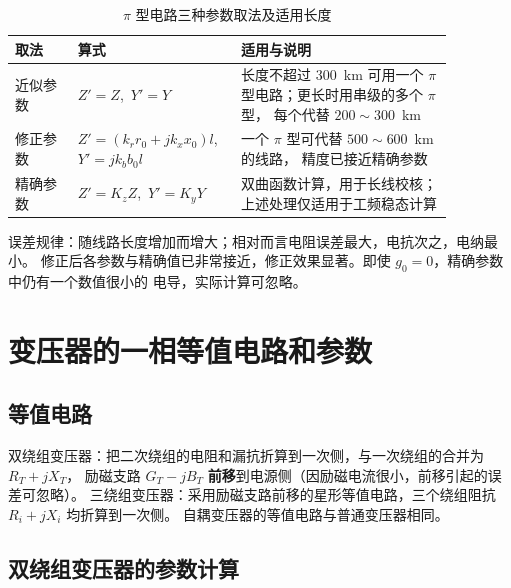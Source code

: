 \begin{table}[htbp]
  \centering
  \caption{$\pi$ 型电路三种参数取法及适用长度}
  \small
  \begin{tabular}{@{}p{0.13\linewidth}p{0.30\linewidth}p{0.44\linewidth}@{}}
    \toprule
    取法 & 算式 & 适用与说明 \\
    \midrule
    近似参数 & $Z'=Z$,\ $Y'=Y$ & 长度不超过 $300$~km 可用一个 $\pi$ 型电路；更长时用串级的多个 $\pi$ 型，
                                    每个代替 $200\sim300$~km \\
    修正参数 & $Z'=(k_rr_0+jk_xx_0)l$,\ $Y'=jk_bb_0l$ & 一个 $\pi$ 型可代替 $500\sim600$~km 的线路，
                                    精度已接近精确参数 \\
    精确参数 & $Z'=K_zZ$,\ $Y'=K_yY$ & 双曲函数计算，用于长线校核；上述处理仅适用于工频稳态计算 \\
    \bottomrule
  \end{tabular}
\end{table}

误差规律：随线路长度增加而增大；相对而言电阻误差最大，电抗次之，电纳最小。
修正后各参数与精确值已非常接近，修正效果显著。即使 $g_0=0$，精确参数中仍有一个数值很小的
电导，实际计算可忽略。


\section{变压器的一相等值电路和参数}

\subsection{等值电路}

双绕组变压器：把二次绕组的电阻和漏抗折算到一次侧，与一次绕组的合并为 $R_T+jX_T$，
励磁支路 $G_T-jB_T$ \textbf{前移}到电源侧（因励磁电流很小，前移引起的误差可忽略）。
三绕组变压器：采用励磁支路前移的星形等值电路，三个绕组阻抗 $R_i+jX_i$ 均折算到一次侧。
自耦变压器的等值电路与普通变压器相同。

\subsection{双绕组变压器的参数计算}

